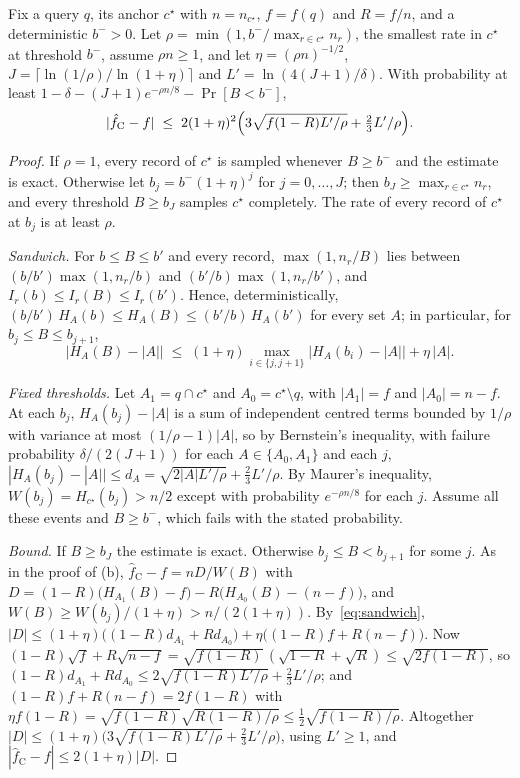 \documentclass[sigconf,review,anonymous]{acmart}
\newcommand{\pref}[1]{\ref{P-#1}}
\begin{document}
\begin{proposition}[Theorem~\pref{thm:calbound}(b) under budget control]\label{prop:budget}
Fix a query $q$, its anchor $c^\star$ with $n=n_{c^\star}$, $f=f(q)$ and $R=f/n$, and a deterministic
$b^->0$. Let $\rho=\min(1,b^-/\max_{r\in c^\star}n_r)$, the smallest rate in $c^\star$ at threshold $b^-$,
assume $\rho n\ge1$, and let $\eta=(\rho n)^{-1/2}$, $J=\lceil\ln(1/\rho)/\ln(1+\eta)\rceil$ and
$L'=\ln(4(J+1)/\delta)$. With probability at least $1-\delta-(J+1)e^{-\rho n/8}-\Pr[B<b^-]$,
\[
 |\hat f_{\mathrm C}-f|\;\le\;2(1+\eta)^2\Bigl(3\sqrt{f(1-R)L'/\rho}+\tfrac23L'/\rho\Bigr).
\]
\end{proposition}
\begin{proof}
If $\rho=1$, every record of $c^\star$ is sampled whenever $B\ge b^-$ and the estimate is exact. Otherwise
let $b_j=b^-(1+\eta)^j$ for $j=0,\dots,J$; then $b_J\ge\max_{r\in c^\star}n_r$, and every threshold
$B\ge b_J$ samples $c^\star$ completely. The rate of every record of $c^\star$ at $b_j$ is at least $\rho$.

\emph{Sandwich.} For $b\le B\le b'$ and every record, $\max(1,n_r/B)$ lies between $(b/b')\max(1,n_r/b)$
and $(b'/b)\max(1,n_r/b')$, and $I_r(b)\le I_r(B)\le I_r(b')$. Hence, deterministically,
$(b/b')\,H_A(b)\le H_A(B)\le(b'/b)\,H_A(b')$ for every set $A$; in particular, for $b_j\le B\le b_{j+1}$,
\begin{equation}\label{eq:sandwich}
 \bigl|H_A(B)-|A|\bigr|\;\le\;(1+\eta)\max_{i\in\{j,j+1\}}\bigl|H_A(b_i)-|A|\bigr|+\eta\,|A|.
\end{equation}

\emph{Fixed thresholds.} Let $A_1=q\cap c^\star$ and $A_0=c^\star\setminus q$, with $|A_1|=f$ and
$|A_0|=n-f$. At each $b_j$, $H_{A}(b_j)-|A|$ is a sum of independent centred terms bounded by $1/\rho$ with
variance at most $(1/\rho-1)|A|$, so by Bernstein's inequality, with failure probability $\delta/(2(J+1))$
for each $A\in\{A_0,A_1\}$ and each $j$, $|H_A(b_j)-|A||\le d_A=\sqrt{2|A|L'/\rho}+\frac23L'/\rho$. By
Maurer's inequality, $W(b_j)=H_{c^\star}(b_j)>n/2$ except with probability $e^{-\rho n/8}$ for each $j$.
Assume all these events and $B\ge b^-$, which fails with the stated probability.

\emph{Bound.} If $B\ge b_J$ the estimate is exact. Otherwise $b_j\le B<b_{j+1}$ for some $j$. As in the
proof of (b), $\hat f_{\mathrm C}-f=nD/W(B)$ with
$D=(1-R)\bigl(H_{A_1}(B)-f\bigr)-R\bigl(H_{A_0}(B)-(n-f)\bigr)$, and $W(B)\ge W(b_j)/(1+\eta)>n/(2(1+\eta))$.
By~\eqref{eq:sandwich},
$|D|\le(1+\eta)\bigl((1-R)d_{A_1}+Rd_{A_0}\bigr)+\eta\bigl((1-R)f+R(n-f)\bigr)$. Now
$(1-R)\sqrt f+R\sqrt{n-f}=\sqrt{f(1-R)}\,(\sqrt{1-R}+\sqrt R)\le\sqrt{2f(1-R)}$, so
$(1-R)d_{A_1}+Rd_{A_0}\le2\sqrt{f(1-R)L'/\rho}+\frac23L'/\rho$; and $(1-R)f+R(n-f)=2f(1-R)$ with
$\eta f(1-R)=\sqrt{f(1-R)}\sqrt{R(1-R)/\rho}\le\frac12\sqrt{f(1-R)/\rho}$. Altogether
$|D|\le(1+\eta)\bigl(3\sqrt{f(1-R)L'/\rho}+\frac23L'/\rho\bigr)$, using $L'\ge1$, and
$|\hat f_{\mathrm C}-f|\le2(1+\eta)|D|$.
\end{proof}
\end{document}
